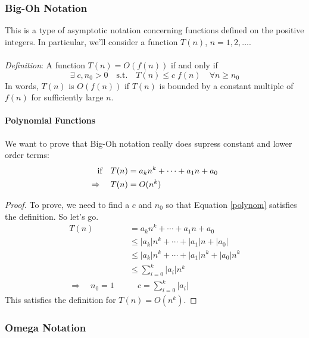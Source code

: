 \documentclass[12pt]{article}
\theoremstyle{plain}
\theoremstyle{definition}
\theoremstyle{remark}
\begin{document}
\subsubsection{Big-Oh Notation}

This is a type of asymptotic notation concerning functions
defined on the positive integers. In particular, 
we'll consider a function $T(n)$, $n=1,2,\ldots$.
\\
\\
{\sl Definition}: A function $T(n) = O(f(n))$ if
and only if
\begin{equation} 
    \exists \; c, n_0 >0 \quad \text{s.t.} \quad 
    T(n) \leq c \; f(n) \quad \forall n \geq n_0
\end{equation} 
In words, $T(n)$ is $O(f(n))$ if $T(n)$ is 
bounded by a constant multiple of $f(n)$ 
for sufficiently large $n$.

\paragraph{Polynomial Functions}

We want to prove that Big-Oh notation really does
supress constant and lower order terms:
\begin{align}
    \text{if} \quad T(n) &= a_k n^k + \cdots + a_1 n + a_0 \notag\\
    \Rightarrow \quad T(n) &= O(n^k) \label{polynom}
\end{align}

\begin{proof} To prove, we need to find a $c$ and $n_0$
so that Equation \ref{polynom} satisfies the definition. 
So let's go.
\begin{align*}
    T(n) &= a_k n^k + \cdots + a_1 n + a_0 \\
    &\leq |a_k| n^k + \cdots + |a_1 | n + |a_0| \\
    &\leq |a_k| n^k + \cdots + |a_1 | n^k + |a_0|n^k \\
    &\leq \sum_{i=0}^k |a_i| n^k \\
    \Rightarrow \quad n_0=1 \quad & \quad c = \sum_{i=0}^k |a_i| 
\end{align*}
This satisfies the definition for $T(n)=O(n^k)$.
\end{proof}

\subsubsection{Omega Notation}
\end{document}
